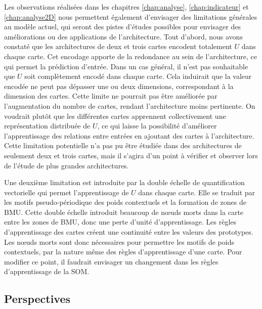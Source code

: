 Les observations réalisées dans les chapitres \ref{chap:analyse}, \ref{chap:indicateur} et \ref{chap:analyse2D} nous permettent également d'envisager des limitations générales au modèle actuel, qui seront des pistes d'études possibles pour envisager des améliorations ou des applications de l'architecture.
Tout d'abord, nous avons constaté que les architectures de deux et trois cartes encodent totalement $U$ dans chaque carte.
Cet encodage apporte de la redondance au sein de l'architecture, ce qui permet la prédiction d'entrée.
Dans un cas général, il n'est pas souhaitable que $U$ soit complètement encodé dans chaque carte.
Cela induirait que la valeur encodée ne peut pas dépasser une ou deux dimensions, correspondant à la dimension des cartes. Cette limite ne pourrait pas être améliorée par l'augmentation du nombre de cartes, rendant l'architecture moins pertinente. 
On voudrait plutôt que les différentes cartes apprennent collectivement une représentation distribuée de $U$, ce qui laisse la possibilité d'améliorer l'apprentissage des relations entre entrées en ajoutant des cartes à l'architecture. Cette limitation potentielle n'a pas pu être étudiée dans des architectures de seulement deux et trois cartes, mais il s'agira d'un point à vérifier et observer lors de l'étude de plus grandes architectures. 

Une deuxième limitation est introduite par la double échelle de quantification vectorielle qui permet l'apprentissage de $U$ dans chaque carte. Elle se traduit par les motifs pseudo-périodique des poids contextuels et la formation de zones de BMU.
Cette double échelle introduit beaucoup de n\oe{}uds morts dans la carte entre les zones de BMU, donc une perte d'unité d'apprentissage.
Les règles d'apprentissage des cartes créent une continuité entre les valeurs des prototypes.  Les n\oe{}uds morts sont donc nécessaires pour permettre les motifs de poids contextuels, par la nature même des règles d'apprentissage d'une carte.
Pour modifier ce point, il faudrait envisager un changement dans les règles d'apprentissage de la SOM.

\subsection*{Perspectives}

